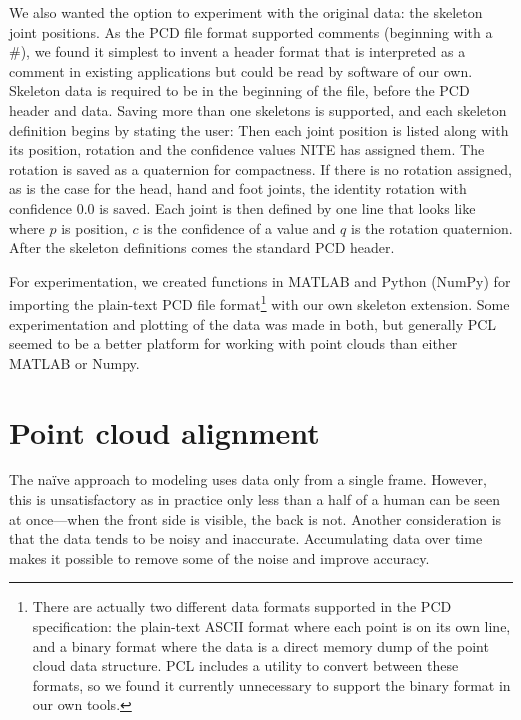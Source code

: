 We also wanted the option to experiment with the original data: the skeleton joint positions. As the PCD file format supported comments (beginning with a \#), we found it simplest to invent a header format that is interpreted as a comment in existing applications but could be read by software of our own. Skeleton data is required to be in the beginning of the file, before the PCD header and data. Saving more than one skeletons is supported, and each skeleton definition begins by stating the user:
%
%
Then each joint position is listed along with its position, rotation and the confidence values NITE has assigned them. The rotation is saved as a quaternion for compactness. If there is no rotation assigned, as is the case for the head, hand and foot joints, the identity rotation with confidence 0.0 is saved. Each joint is then defined by one line that looks like
%
%
where $p$ is position, $c$ is the confidence of a value and $q$ is the rotation quaternion. After the skeleton definitions comes the standard PCD header.

For experimentation, we created functions in MATLAB and Python (NumPy) for importing the plain-text PCD file format\footnote{There are actually two different data formats supported in the PCD specification: the plain-text ASCII format where each point is on its own line, and a binary format where the data is a direct memory dump of the point cloud data structure. PCL includes a utility to convert between these formats, so we found it currently unnecessary to support the binary format in our own tools.} with our own skeleton extension. Some experimentation and plotting of the data was made in both, but generally PCL seemed to be a better platform for working with point clouds than either MATLAB or Numpy.

\section{Point cloud alignment} \label{approach.alignment}

The naïve approach to modeling uses data only from a single frame. However, this is unsatisfactory as in practice only less than a half of a human can be seen at once---when the front side is visible, the back is not. Another consideration is that the data tends to be noisy and inaccurate. Accumulating data over time makes it possible to remove some of the noise and improve accuracy.

